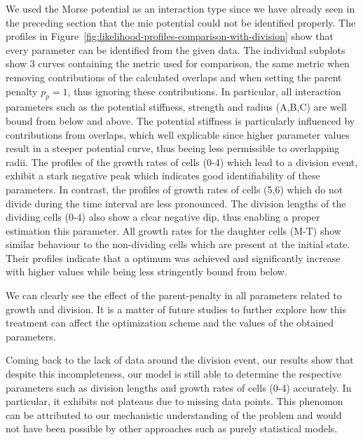 We used the Morse potential as an interaction type since we have already seen in the preceding
section that the mie potential could not be identified properly.
The profiles in Figure~\ref{fig:likelihood-profiles-comparison-with-division} show that every
parameter can be identified from the given data.
The individual subplots show 3 curves containing the metric used for comparison, the same metric
when removing contributions of the calculated overlaps and when setting the parent
penalty $p_p=1$,
thus ignoring these contributions.
In particular, all interaction parameters such as the potential stiffness, strength and radius
(A,B,C) are well bound from below and above.
The potential stiffness is particularly influenced by contributions from overlaps, which well
explicable since higher parameter values result in a steeper potential curve, thus beeing less
permissible to overlapping radii.
The profiles of the growth rates of cells (0-4) which lead to a division event, exhibit a stark
negative peak which indicates good identifiability of these parameters.
In contrast, the profiles of growth rates of cells (5,6) which do not divide during the time
interval are less pronounced.
The division lengths of the dividing cells (0-4) also show a clear negative dip, thus enabling a
proper estimation this parameter.
All growth rates for the daughter cells (M-T) show similar behaviour to the
non-dividing cells which are present at the initial state.
Their profiles indicate that a optimum was achieved and significantly increase with
higher values
while being less stringently bound from below.

We can clearly see the effect of the parent-penalty in all parameters related to growth and
division.
It is a matter of future studies to further explore how this treatment can affect the
optimization
scheme and the values of the obtained parameters.

Coming back to the lack of data around the division event, our results show that despite this
incompleteness, our model is still able to determine the respective parameters such as division
lengths and growth rates of cells (0-4) accurately.
In particular, it exhibits not plateaus due to missing data points.
This phenomon can be attributed to our mechanistic understanding of the problem and
would not have
been possible by other approaches such as purely statistical models.

